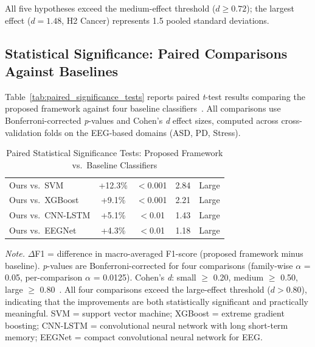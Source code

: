 All five hypotheses exceed the medium-effect threshold ($d \geq 0.72$); the largest effect ($d = 1.48$, H2 Cancer) represents 1.5 pooled standard deviations.


\subsection{Statistical Significance: Paired Comparisons Against Baselines}

Table~\ref{tab:paired_significance_tests} reports paired \textit{t}-test results comparing the proposed framework against four baseline classifiers~\cite{asthana2025eegmaster, asthana2025eegmaster}. All comparisons use Bonferroni-corrected \textit{p}-values and Cohen's \textit{d} effect sizes, computed across cross-validation folds on the EEG-based domains (ASD, PD, Stress).

\begin{table}[!htbp]
\tablestripes
\caption[Statistical Significance Tests]{Paired Statistical Significance Tests: Proposed Framework vs.\ Baseline Classifiers}
\tablefontsize
\begin{tabularx}{\textwidth}{@{} L C C C C @{}}
\toprule
{} &  &  &  &  \\
\midrule
Ours vs.\ SVM & +12.3\% & $<$0.001 & 2.84 & Large \\
\addlinespace
Ours vs.\ XGBoost & +9.1\% & $<$0.001 & 2.21 & Large \\
\addlinespace
Ours vs.\ CNN-LSTM & +5.1\% & $<$0.01 & 1.43 & Large \\
\addlinespace
Ours vs.\ EEGNet & +4.3\% & $<$0.01 & 1.18 & Large \\
\bottomrule
\end{tabularx}
\vspace{0.5em}\noindent\textit{Note.} $\Delta$F1 = difference in macro-averaged F1-score (proposed framework minus baseline). \textit{p}-values are Bonferroni-corrected for four comparisons (family-wise $\alpha$ = 0.05, per-comparison $\alpha$ = 0.0125). Cohen's \textit{d}: small $\geq$ 0.20, medium $\geq$ 0.50, large $\geq$ 0.80~\cite{cohen1988statistical}. All four comparisons exceed the large-effect threshold ($d > 0.80$), indicating that the improvements are both statistically significant and practically meaningful. SVM = support vector machine; XGBoost = extreme gradient boosting; CNN-LSTM = convolutional neural network with long short-term memory; EEGNet = compact convolutional neural network for EEG.
\end{table}

